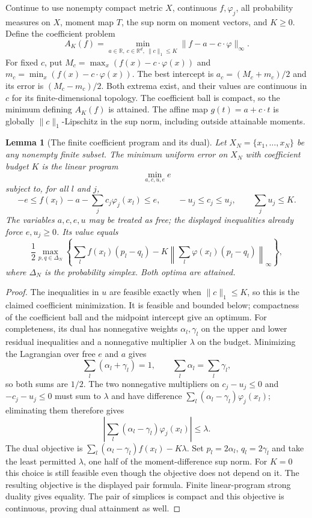 \documentclass[11pt]{article}
\newtheorem{lemma}{Lemma}
\theoremstyle{definition}
\begin{document}
Continue to use nonempty compact metric $X$, continuous $f,\varphi_j$, all probability
measures on $X$, moment map $T$, the sup norm on moment vectors, and $K\geq0$.
Define the coefficient problem
\[
 A_K(f)=\min_{a\in\mathbb R,\ c\in\mathbb R^d,\ \|c\|_1\leq K}
          \|f-a-c\cdot\varphi\|_\infty.
\]
For fixed $c$, put $M_c=\max_x(f(x)-c\cdot\varphi(x))$ and
$m_c=\min_x(f(x)-c\cdot\varphi(x))$. The best intercept is
$a_c=(M_c+m_c)/2$ and its error is $(M_c-m_c)/2$. Both extrema exist,
and their values are continuous in $c$ for its finite-dimensional topology.
The coefficient ball is compact, so the minimum defining $A_K(f)$ is
attained. The affine map $g(t)=a+c\cdot t$ is globally
$\|c\|_1$-Lipschitz in the sup norm, including outside attainable moments.

\begin{lemma}[The finite coefficient program and its dual]
Let $X_N=\{x_1,\ldots,x_N\}$ be any nonempty finite subset. The minimum
uniform error on $X_N$ with coefficient budget $K$ is the linear program
\[
 \min_{a,c,u,e}e
\]
subject to, for all $l$ and $j$,
\[
 -e\leq f(x_l)-a-\sum_jc_j\varphi_j(x_l)\leq e,
 \qquad -u_j\leq c_j\leq u_j,\qquad \sum_j u_j\leq K.
\]
The variables $a,c,e,u$ may be treated as free; the displayed inequalities
already force $e,u_j\geq0$. Its value equals
\[
 \frac12\max_{p,q\in\Delta_N}
 \left\{\sum_l f(x_l)(p_l-q_l)
       -K\left\|\sum_l\varphi(x_l)(p_l-q_l)\right\|_\infty\right\},
\]
where $\Delta_N$ is the probability simplex. Both optima are attained.
\end{lemma}
\begin{proof}
The inequalities in $u$ are feasible exactly when $\|c\|_1\leq K$,
so this is the claimed coefficient minimization. It is feasible and bounded
below; compactness of the coefficient ball and the midpoint intercept give
an optimum.
For completeness, its dual has nonnegative weights $\alpha_l,\gamma_l$
on the upper and lower residual inequalities and a nonnegative multiplier
$\lambda$ on the budget. Minimizing the Lagrangian over free $e$ and $a$
gives
\[
 \sum_l(\alpha_l+\gamma_l)=1,\qquad
 \sum_l\alpha_l=\sum_l\gamma_l,
\]
so both sums are $1/2$. The two nonnegative multipliers on
$c_j-u_j\leq0$ and $-c_j-u_j\leq0$ must sum to $\lambda$ and have
difference $\sum_l(\alpha_l-\gamma_l)\varphi_j(x_l)$; eliminating them
therefore gives
\[
 \left|\sum_l(\alpha_l-\gamma_l)\varphi_j(x_l)\right|\leq\lambda.
\]
The dual objective is
$\sum_l(\alpha_l-\gamma_l)f(x_l)-K\lambda$.
Set $p_l=2\alpha_l$, $q_l=2\gamma_l$ and take the least permitted
$\lambda$, one half of the moment-difference sup norm. For $K=0$ this
choice is still feasible even though the objective does not depend on it.
The resulting objective is the displayed pair formula. Finite linear-program
strong duality gives equality. The pair of simplices is compact and this
objective is continuous, proving dual attainment as well.
\end{proof}
\end{document}
